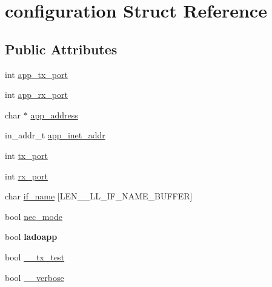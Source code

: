 \hypertarget{structconfiguration}{\section{configuration \-Struct \-Reference}
\label{structconfiguration}
}
\subsection*{\-Public \-Attributes}
\begin{DoxyCompactItemize}
\item 
int \hyperlink{structconfiguration_af7620150c992aa51a8fc9133036c97bd}{app\-\_\-tx\-\_\-port}
\item 
int \hyperlink{structconfiguration_a89303758b5819edf998f2e2f6b075216}{app\-\_\-rx\-\_\-port}
\item 
char $\ast$ \hyperlink{structconfiguration_a50ce734299291eb2bbad55de949fa29f}{app\-\_\-address}
\item 
in\-\_\-addr\-\_\-t \hyperlink{structconfiguration_a07b4124a5e4551d7c369bec893b93a17}{app\-\_\-inet\-\_\-addr}
\item 
int \hyperlink{structconfiguration_af79c6d51736c36e2a56c6837bcbaa1e5}{tx\-\_\-port}
\item 
int \hyperlink{structconfiguration_a8da9b0ad2f0b9fc5e3e742c4554d79e6}{rx\-\_\-port}
\item 
char \hyperlink{structconfiguration_a6fb72672d5c6714cbea3b62025aa7c12}{if\-\_\-name} \mbox{[}\-L\-E\-N\-\_\-\-\_\-\-L\-L\-\_\-\-I\-F\-\_\-\-N\-A\-M\-E\-\_\-\-B\-U\-F\-F\-E\-R\mbox{]}
\item 
bool \hyperlink{structconfiguration_abe68f6a23eea6d488a7aadf74ed9e9df}{nec\-\_\-mode}
\item 
\hypertarget{structconfiguration_a7c2d88ec9e10baa0f2a2462a4f58e868}{bool {\bfseries ladoapp}}\label{structconfiguration_a7c2d88ec9e10baa0f2a2462a4f58e868}

\item 
bool \hyperlink{structconfiguration_ab091029031b2162a70659a7508c5e969}{\-\_\-\-\_\-tx\-\_\-test}
\item 
bool \hyperlink{structconfiguration_a41c9072ed719e9b35f559682b7a79949}{\-\_\-\-\_\-verbose}
\end{DoxyCompactItemize}


